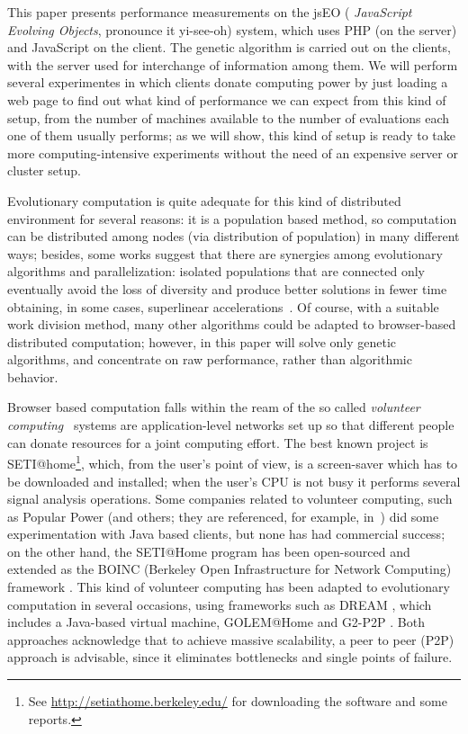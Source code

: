\documentclass{llncs}
\begin{document}
This paper presents performance measurements on the jsEO ({\em
  JavaScript Evolving Objects}, pronounce it yi-see-oh) system, which uses PHP 
 (on the server) and JavaScript on the client. The genetic algorithm is carried out  on the clients,
with the server used  for interchange of information among
them. We will perform several experimentes in which clients donate
computing power by just loading a web page to find out what kind of
performance we can expect from this kind of setup, from the number of
machines available to the number of evaluations each one of them
usually performs; as we will show, this kind of setup is ready to take more
computing-intensive experiments without the need of an expensive server or cluster
setup. 

Evolutionary computation is quite adequate for this
kind of distributed environment for several reasons: it is a population based method,
so computation can be distributed among nodes (via distribution of
population) in many different ways;
besides, some works suggest that there are synergies among evolutionary
algorithms and parallelization: isolated populations that are
connected only eventually avoid the loss of diversity and produce
better solutions in fewer time obtaining, in some cases, superlinear
accelerations~\cite{cantu-paz:migration-policies}. Of course, with a suitable work division method, many other algorithms
could be adapted to browser-based distributed computation; however, in
this paper will solve only genetic algorithms, and concentrate on raw
performance, rather than algorithmic behavior. 

Browser based computation falls within the ream of the so called  {\em volunteer
computing}~\cite{sarmenta-bayanihan,hpvc} systems are
application-level networks set up so that different people
can donate resources for a joint computing  effort.
The best known project is SETI@home\footnote{See
\url{http://setiathome.berkeley.edu/} for downloading the software  and some
reports.}, which, from the user's point of view, is a screen-saver which has to be
downloaded and installed; when the user's CPU is not busy it performs
several signal analysis operations.
Some companies related to volunteer computing, such as Popular Power (and
others; they are referenced,
for example, in~\cite{Cappello}) did some experimentation with Java based
clients, but none has had commercial success; on the other hand, the
SETI@Home program has been open-sourced and extended as the BOINC
(Berkeley Open Infrastructure for Network Computing) 
framework \cite{boinc_grid04}. This kind of volunteer computing has
been adapted to evolutionary computation in several occasions, using
frameworks such as DREAM \cite{LNCS2439:ID197:pp665}, which includes a
Java-based virtual machine, GOLEM@Home and G2-P2P \cite{G2-P2P}. Both approaches
acknowledge that to achieve massive scalability, a peer to peer (P2P)
approach is advisable, since it eliminates bottlenecks and single
points of failure. 
\end{document}
